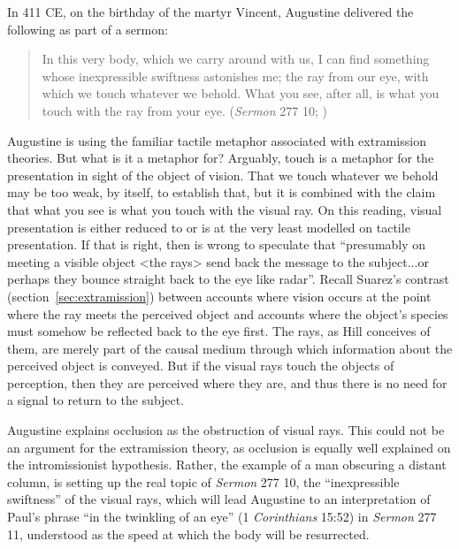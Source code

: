 \documentclass[12pt]{article}
\begin{document}
In 411 CE, on the birthday of the martyr Vincent, Augustine delivered the following as part of a sermon:
\begin{quote}
	In this very body, which we carry around with us, I can find something whose inexpressible swiftness astonishes me; the ray from our eye, with which we touch whatever we behold. What you see, after all, is what you touch with the ray from your eye. (\emph{Sermon} 277 10; \citealt[38]{Hill:1994aa})
\end{quote}
Augustine is using the familiar tactile metaphor associated with extramission theories. But what is it a metaphor for? Arguably, touch is a metaphor for the presentation in sight of the object of vision. That we touch whatever we behold may be too weak, by itself, to establish that, but it is combined with the claim that what you see is what you touch with the visual ray. On this reading, visual presentation is either reduced to or is at the very least modelled on tactile presentation. If that is right, then \citet[46 n.17]{Hill:1994aa} is wrong to speculate that ``presumably on meeting a visible object <the rays> send back the message to the subject...or perhaps they bounce straight back to the eye like radar''. Recall Suarez's contrast (section~\ref{sec:extramission}) between accounts where vision occurs at the point where the ray meets the perceived object and accounts where the object’s species must somehow be reflected back to the eye first. The rays, as Hill conceives of them, are merely part of the causal medium through which information about the perceived object is conveyed. But if the visual rays touch the objects of perception, then they are perceived where they are, and thus there is no need for a signal to return to the subject.

Augustine explains occlusion as the obstruction of visual rays. This could not be an argument for the extramission theory, as occlusion is equally well explained on the intromissionist hypothesis. Rather, the example of a man obscuring a distant column, is setting up the real topic of \emph{Sermon} 277 10, the ``inexpressible swiftness'' of the visual rays, which will lead Augustine to an interpretation of Paul's phrase ``in the twinkling of an eye'' (1 \emph{Corinthians} 15:52) in \emph{Sermon} 277 11, understood as the speed at which the body will be resurrected.
\end{document}
